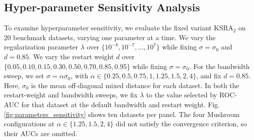 \documentclass[ASNA,twocolumn]{USG} %
\begin{document}
\begin{table}[!ht]
    \centering
    \caption{Pairwise ROC-AUC comparisons between KSRA and the 11 baselines using two-sided Wilcoxon signed-rank tests with Holm correction.}
    \label{tab:wilcoxon_holm}
\end{table}



\subsection{Hyper-parameter Sensitivity Analysis}

To examine hyperparameter sensitivity, we evaluate the fixed variant KSRA$_2$ on 20 benchmark datasets, varying one parameter at a time. We vary the regularization parameter $\lambda$ over $\{10^{-8},10^{-7},\ldots,10^7\}$ while fixing $\sigma=\sigma_0$ and $d=0.85$. We vary the restart weight $d$ over $\{0.05,0.10,0.15,0.30,0.50,0.70,0.85,0.95\}$ while fixing $\sigma=\sigma_0$. For the bandwidth sweep, we set $\sigma=\alpha\sigma_0$, with $\alpha\in\{0.25,0.5,0.75,1,1.25,1.5,2,4\}$, and fix $d=0.85$. Here, $\sigma_0$ is the mean off-diagonal mixed distance for each dataset. In both the restart-weight and bandwidth sweeps, we fix $\lambda$ to the value selected by ROC-AUC for that dataset at the default bandwidth and restart weight. Fig.\ref{fig:parameters_sensitivity} shows ten datasets per panel. The four Mushroom configurations at $\alpha\in\{1.25,1.5,2,4\}$ did not satisfy the convergence criterion, so their AUCs are omitted.
\end{document}
